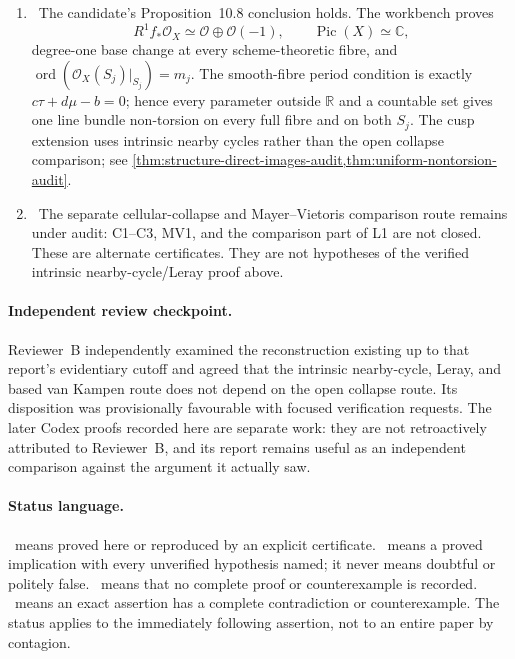 \begin{enumerate}[leftmargin=1.8em]
\item \Verified\ The candidate's Proposition~10.8 conclusion holds.  The
workbench proves
\[
R^1f_*\mathcal O_X\simeq\mathcal O\oplus\mathcal O(-1),\qquad
\operatorname{Pic}(X)\simeq\mathbb C,
\]
degree-one base change at every scheme-theoretic fibre, and
\(\operatorname{ord}(\mathcal O_X(S_j)|_{S_j})=m_j\).  The smooth-fibre
period condition is exactly \(c\tau+d\mu-b=0\); hence every parameter
outside \(\mathbb R\) and a countable set gives one line bundle non-torsion
on every full fibre and on both \(S_j\).  The cusp extension uses intrinsic
nearby cycles rather than the open collapse comparison; see
\cref{thm:structure-direct-images-audit,thm:uniform-nontorsion-audit}.

\item \Open\ The separate cellular-collapse and Mayer--Vietoris comparison
route remains under audit: C1--C3, MV1, and the comparison part of L1 are not
closed.  These are alternate certificates.  They are not hypotheses of the
verified intrinsic nearby-cycle/Leray proof above.
\end{enumerate}

\paragraph{Independent review checkpoint.}
Reviewer~B independently examined the reconstruction existing up to that
report's evidentiary cutoff and agreed that the intrinsic nearby-cycle,
Leray, and based van Kampen route does not depend on the open collapse route.
Its disposition was provisionally favourable with focused verification
requests.  The later Codex proofs recorded here are separate work: they are
not retroactively attributed to Reviewer~B, and its report remains useful as
an independent comparison against the argument it actually saw.

\paragraph{Status language.}
\Verified\ means proved here or reproduced by an explicit certificate.
\Conditional\ means a proved implication with every unverified hypothesis
named; it never means doubtful or politely false.  \Open\ means that no
complete proof or counterexample is recorded.  \Refuted\ means an exact
assertion has a complete contradiction or counterexample.  The status applies
to the immediately following assertion, not to an entire paper by contagion.
